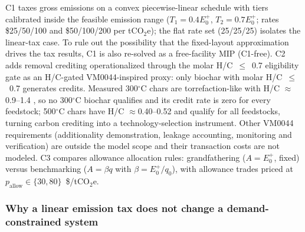 C1 taxes gross emissions on a convex piecewise-linear schedule with tiers
calibrated inside the feasible emission range ($T_1=0.4E^{+}_0$, $T_2=0.7E^{+}_0$;
rates \$25/50/100 and \$50/100/200 per tCO$_2$e); the flat rate set
(25/25/25) isolates the linear-tax case. To rule out the possibility that the
fixed-layout approximation drives the tax results, C1 is also re-solved as a
free-facility MIP (C1-free). C2 adds removal crediting operationalized through
the molar H/C~$\le$~0.7 eligibility gate as an H/C-gated VM0044-inspired
proxy:
only biochar with molar H/C~$\le$~0.7 generates credits. Measured 300$^\circ$C
chars are torrefaction-like with H/C $\approx$0.9--1.4
\cite{rafiq2016,ippolito2020}, so no 300$^\circ$C biochar qualifies and
its credit rate is zero for every feedstock; 500$^\circ$C chars have H/C
$\approx$0.40--0.52 \cite{rafiq2016,enders2012,ippolito2020} and qualify for
all feedstocks, turning carbon crediting into a technology-selection
instrument. Other VM0044 requirements (additionality
demonstration, leakage accounting, monitoring and verification) are outside the
model scope and their transaction costs are not modeled. C3 compares allowance
allocation rules: grandfathering ($A=E^{+}_0$, fixed) versus benchmarking
($A=\beta q$ with $\beta=E^{+}_0/q_0$), with allowance trades priced at
$p_{\mathrm{allow}}\in\{30,80\}$~\$/tCO$_2$e.

\subsubsection{Why a linear emission tax does not change a demand-constrained system}

